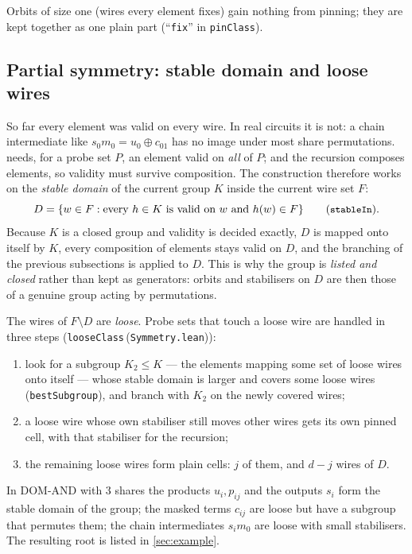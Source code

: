 \documentclass[11pt,a4paper]{article}
\theoremstyle{definition}
\theoremstyle{remark}
\newcommand{\code}[1]{\texttt{\small #1}}
\newcommand{\lean}[2]{\code{#1}\,(\code{#2})}
\begin{document}
Orbits of size one (wires every element fixes) gain nothing from pinning; they are kept
together as one plain part (``\code{fix}'' in \code{pinClass}).

\subsection{Partial symmetry: stable domain and loose wires}

So far every element was valid on every wire.  In real circuits it is not: a chain
intermediate like $s_0m_0 = u_0\oplus c_{01}$ has no image under most share permutations.
 needs, for a probe set $P$, an element valid on \emph{all} of $P$; and the
recursion composes elements, so validity must survive composition.  The construction
therefore works on the \emph{stable domain} of the current group $K$ inside the current
wire set $F$:
\[ D = \{w\in F : \text{every } h\in K \text{ is valid on } w \text{ and } h(w)\in F\}
\qquad(\code{stableIn}). \]
Because $K$ is a closed group and validity is decided exactly, $D$ is mapped onto itself
by $K$, every composition of elements stays valid on $D$, and the branching of the previous
subsections is applied to $D$.  This is why the group is \emph{listed and closed} rather
than kept as generators: orbits and stabilisers on $D$ are then those of a genuine group
acting by permutations.

The wires of $F\setminus D$ are \emph{loose}.  Probe sets that touch a loose wire are
handled in three steps (\lean{looseClass}{Symmetry.lean}):
\begin{enumerate}[leftmargin=*]
\item look for a subgroup $K_2\le K$ --- the elements mapping some set of loose wires onto
  itself --- whose stable domain is larger and covers some loose wires
  (\code{bestSubgroup}), and branch with $K_2$ on the newly covered wires;
\item a loose wire whose own stabiliser still moves other wires gets its own pinned cell,
  with that stabiliser for the recursion;
\item the remaining loose wires form plain cells: $j$ of them, and $d-j$ wires of $D$.
\end{enumerate}
In DOM-AND with 3 shares the products $u_i,p_{ij}$ and the outputs $s_i$ form the stable
domain of the group; the masked terms $c_{ij}$ are loose but have a subgroup that
permutes them; the chain intermediates $s_im_0$ are loose with small stabilisers.  The
resulting root is listed in \cref{sec:example}.
\end{document}

